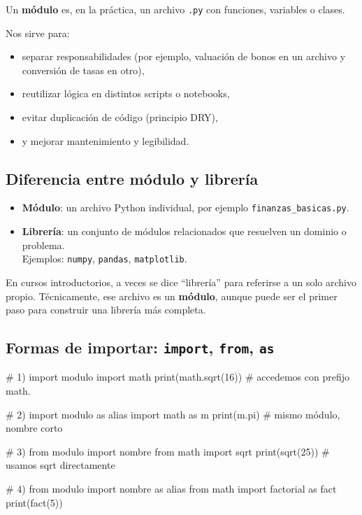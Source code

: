 \documentclass[
  spanish,
  letterpaper,
  DIV=11,
  numbers=noendperiod]{scrreprt}
\newenvironment{Shaded}{\begin{snugshade}}{\end{snugshade}}
\newcommand{\NormalTok}[1]{\textcolor[rgb]{0.00,0.23,0.31}{#1}}
\providecommand{\tightlist}{%
  \setlength{\itemsep}{0pt}\setlength{\parskip}{0pt}}
\begin{document}
Un \textbf{módulo} es, en la práctica, un archivo \texttt{.py} con
funciones, variables o clases.

Nos sirve para:

\begin{itemize}
\tightlist
\item
  separar responsabilidades (por ejemplo, valuación de bonos en un
  archivo y conversión de tasas en otro),
\item
  reutilizar lógica en distintos scripts o notebooks,
\item
  evitar duplicación de código (principio DRY),
\item
  y mejorar mantenimiento y legibilidad.
\end{itemize}

\subsection{Diferencia entre módulo y
librería}\label{diferencia-entre-muxf3dulo-y-libreruxeda}

\begin{itemize}
\tightlist
\item
  \textbf{Módulo}: un archivo Python individual, por ejemplo
  \texttt{finanzas\_basicas.py}.
\item
  \textbf{Librería}: un conjunto de módulos relacionados que resuelven
  un dominio o problema.\\
  Ejemplos: \texttt{numpy}, \texttt{pandas}, \texttt{matplotlib}.
\end{itemize}

En cursos introductorios, a veces se dice ``librería'' para referirse a
un solo archivo propio. Técnicamente, ese archivo es un \textbf{módulo},
aunque puede ser el primer paso para construir una librería más
completa.

\subsection{\texorpdfstring{Formas de importar: \texttt{import},
\texttt{from},
\texttt{as}}{Formas de importar: import, from, as}}\label{formas-de-importar-import-from-as}

\begin{Shaded}
\begin{Highlighting}[]
\NormalTok{\# 1) import modulo}
\NormalTok{import math}
\NormalTok{print(math.sqrt(16))  \# accedemos con prefijo math.}

\NormalTok{\# 2) import modulo as alias}
\NormalTok{import math as m}
\NormalTok{print(m.pi)  \# mismo módulo, nombre corto}

\NormalTok{\# 3) from modulo import nombre}
\NormalTok{from math import sqrt}
\NormalTok{print(sqrt(25))  \# usamos sqrt directamente}

\NormalTok{\# 4) from modulo import nombre as alias}
\NormalTok{from math import factorial as fact}
\NormalTok{print(fact(5))}
\end{Highlighting}
\end{Shaded}
\end{document}
